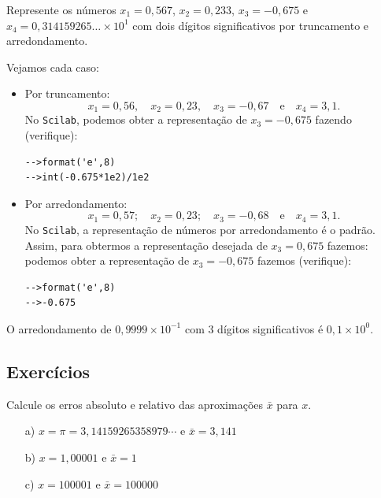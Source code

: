 \begin{ex} Represente os números $x_1 = 0,567$, $x_2 = 0,233$, $x_3 = -0,675$ e $x_4 = 0,314159265 \ldots \times 10^1$ com dois dígitos significativos por truncamento e arredondamento.
\end{ex}
\begin{sol} Vejamos cada caso:
  \begin{itemize}
  \item Por truncamento:
    \begin{equation*}
      x_1=0,56,\quad x_2=0,23,\quad x_3=-0,67\quad\mbox{e}\quad x_4 = 3,1.
    \end{equation*}
\ifisscilab
No \verb+Scilab+, podemos obter a representação de $x_3 = -0,675$ fazendo (verifique):
\begin{verbatim}
-->format('e',8)
-->int(-0.675*1e2)/1e2
\end{verbatim}
\fi
  \item Por arredondamento:
    \begin{equation*}
      x_1=0,57;\quad x_2=0,23;\quad x_3=-0,68\quad\mbox{e}\quad x_4 = 3,1.  
    \end{equation*}
\ifisscilab
No \verb+Scilab+, a representação de números por arredondamento é o padrão. Assim, para obtermos a representação desejada de $x_3 = 0,675$ fazemos: podemos obter a representação de $x_3 = -0,675$ fazemos (verifique):
\begin{verbatim}
-->format('e',8)
-->-0.675
\end{verbatim}
\fi
  \end{itemize}
\end{sol}


\begin{ex}
  O arredondamento de $0,9999\times 10^{-1}$ com $3$ dígitos significativos é $0,1\times 10^{0}$.
\end{ex}


\subsection{Exercícios}

\begin{Exercise} Calcule os erros absoluto e relativo das aproximações $\bar{x}$ para $x$.
  \begin{itemize}
  \item[a)] $x=\pi=3,14159265358979\cdots$ e $\bar{x}=3,141$
  \item[b)] $x=1,00001$ e $\bar{x}=1$
  \item[c)] $x=100001$ e $\bar{x}=100000$
  \end{itemize}
\end{Exercise}


